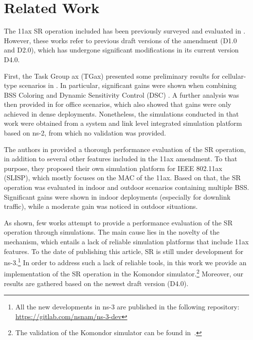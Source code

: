 \documentclass[conference]{IEEEtran}
\begin{document}
	\section{Related Work}
	\label{section:related_work}
	
	The 11ax SR operation included has been previously surveyed and evaluated in \cite{bellalta2016ieee,khorov2018tutorial,sr_evaluation_1,sr_evaluation_2}. However, these works refer to previous draft versions of the amendment (D1.0 and D2.0), which has undergone significant modifications in its current version D4.0.

	First, the Task Group ax (TGax) presented some preliminary results for cellular-type scenarios in \cite{sr_evaluation_1}. In particular, significant gains were shown when combining BSS Coloring and Dynamic Sensitivity Control (DSC) \cite{smith2017dynamic}. A further analysis was then provided in \cite{sr_evaluation_2} for office scenarios, which also showed that gains were only achieved in dense deployments. Nonetheless, the simulations conducted in that work were obtained from a system and link level integrated simulation platform based on ns-2, from which no validation was provided.
	
	The authors in \cite{sr_evaluation_3} provided a thorough performance evaluation of the SR operation, in addition to several other features included in the 11ax amendment. To that purpose, they proposed their own simulation platform for IEEE 802.11ax (SLISP), which mostly focuses on the MAC of the 11ax. Based on that, the SR operation was evaluated in indoor and outdoor scenarios containing multiple BSS. Significant gains were shown in indoor deployments (especially for downlink traffic), while a moderate gain was noticed in outdoor situations.
	
	As shown, few works attempt to provide a performance evaluation of the SR operation through simulations. The main cause lies in the novelty of the mechanism, which entails a lack of reliable simulation platforms that include 11ax features. To the date of publishing this article, SR is still under development for ns-3.\footnote{All the new developments in ns-3 are published in the following repository: \url{https://gitlab.com/nsnam/ns-3-dev}} In order to address such a lack of reliable tools, in this work we provide an implementation of the SR operation in the Komondor simulator.\footnote{The validation of the Komondor simulator can be found in~\cite{komondor}.} Moreover, our results are gathered based on the newest draft version (D4.0).
	
\end{document}
